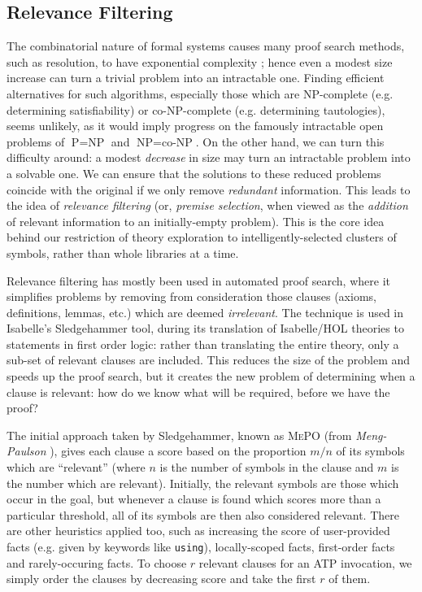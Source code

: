 \subsection{Relevance Filtering}
\label{sec:relevance}

The combinatorial nature of formal systems causes many proof search methods, such as resolution, to have exponential complexity \citep{haken1985intractability}; hence even a modest size increase can turn a trivial problem into an intractable one. Finding efficient alternatives for such algorithms, especially those which are NP-complete (e.g. determining satisfiability) or co-NP-complete (e.g. determining tautologies), seems unlikely, as it would imply progress on the famously intractable open problems of $\text{P} = \text{NP}$ and $\text{NP} = \text{co-NP}$. On the other hand, we can turn this difficulty around: a modest \emph{decrease} in size may turn an intractable problem into a solvable one. We can ensure that the solutions to these reduced problems coincide with the original if we only remove \emph{redundant} information. This leads to the idea of \emph{relevance filtering} (or, \emph{premise selection}, when viewed as the \emph{addition} of relevant information to an initially-empty problem). This is the core idea behind our restriction of theory exploration to intelligently-selected clusters of symbols, rather than whole libraries at a time.

Relevance filtering has mostly been used in automated proof search, where it simplifies problems by removing from consideration those clauses (axioms, definitions, lemmas, etc.) which are deemed \emph{irrelevant}. The technique is used in Isabelle's Sledgehammer tool, during its translation of Isabelle/HOL theories to statements in first order logic: rather than translating the entire theory, only a sub-set of relevant clauses are included. This reduces the size of the problem and speeds up the proof search, but it creates the new problem of determining when a clause is relevant: how do we know what will be required, before we have the proof?

The initial approach taken by Sledgehammer, known as \textsc{MePO} \iffalse TODO: Check name \fi (from \emph{Meng-Paulson} \citep{meng2009lightweight}), gives each clause a score based on the proportion $m / n$ of its symbols which are ``relevant'' (where $n$ is the number of symbols in the clause and $m$ is the number which are relevant). Initially, the relevant symbols are those which occur in the goal, but whenever a clause is found which scores more than a particular threshold, all of its symbols are then also considered relevant. There are other heuristics applied too, such as increasing the score of user-provided facts (e.g. given by keywords like \texttt{using}), locally-scoped facts, first-order facts and rarely-occuring facts. To choose $r$ relevant clauses for an ATP invocation, we simply order the clauses by decreasing score and take the first $r$ of them.

